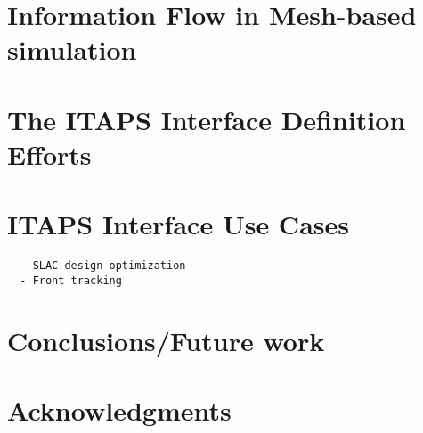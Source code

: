 \documentclass[11pt]{article}
\begin{document}
\section{Information Flow in Mesh-based simulation}



\section{The ITAPS Interface Definition Efforts}



\section{ITAPS Interface Use Cases}




\begin{verbatim}
  - SLAC design optimization 
  - Front tracking
\end{verbatim}

\section{Conclusions/Future work}


\section*{Acknowledgments} 



\end{document}
